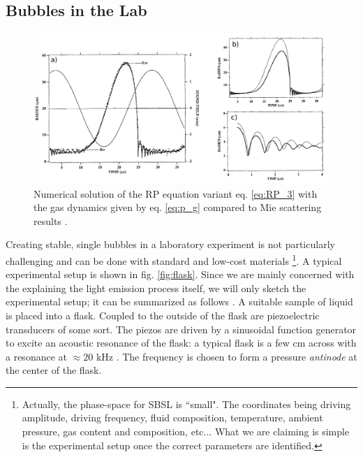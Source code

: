 \documentclass[prb,aps,nofootinbib,superscriptaddress,floatfix]{revtex4-2}
\begin{document}
\subsection{Bubbles in the Lab}
\begin{figure}
\includegraphics[width=0.9\linewidth]{figs/bubble_radius_1.pdf}
    \caption{Numerical solution of the RP equation variant eq. \ref{eq:RP_3} with the gas dynamics given by eq. \ref{eq:p_g} compared to Mie scattering results \cite{barber1997defining,barber1992light}.}
\label{fig:bubble_radius_1}
\end{figure}

Creating stable, single bubbles in a laboratory experiment is not particularly challenging and can be done with standard and low-cost materials \footnote{Actually, the phase-space for SBSL is ``small". The coordinates being driving amplitude, driving frequency, fluid composition, temperature, ambient pressure, gas content and composition, etc... What we are claiming is simple is the experimental setup once the correct parameters are identified.}. A typical experimental setup is shown in fig. \ref{fig:flask}. Since we are mainly concerned with the explaining the light emission process itself, we will only sketch the experimental setup; it can be summarized as follows \cite{lentz1995mie,gaitan1990experimental,gaitan1992sonoluminescence,gompf2000mie,brenner2002single,yasui2018acoustic,brennen2014cavitation,suslick2008inside}. A suitable sample of liquid is placed into a flask. Coupled to the outside of the flask are piezoelectric transducers of some sort. The piezos are driven by a sinusoidal function generator to excite an acoustic resonance of the flask: a typical flask is a few cm across with a resonance at $\approx 20$ kHz \cite{brenner2002single}. The frequency is chosen to form a pressure \emph{antinode} at the center of the flask.
\end{document}
